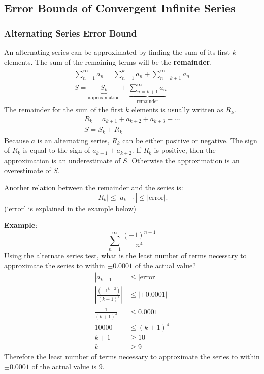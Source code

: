 \documentclass[12pt]{article}
\begin{document}
        \subsection{Error Bounds of Convergent Infinite Series}
            \subsubsection{Alternating Series Error Bound}
                An alternating series can be approximated by finding the sum of its first $k$ elements. The sum of the remaining terms will be the \textbf{remainder}.
                \begin{gather*}
                    \sum_{n=1}^\infty a_n = \sum_{n=1}^k a_n + \sum_{n=k+1}^\infty a_n \\[10pt]
                    S = \underbrace{S_k}_{\text{approximation}} + \underbrace{\sum_{n=k+1}^\infty a_n}_{\text{remainder}}
                \end{gather*}
                The remainder for the sum of the first $k$ elements is usually written as $R_k$.
                \begin{gather*}
                    R_k = a_{k+1} + a_{k+2} + a_{k+3} + \cdots \\
                    S = S_k + R_k
                \end{gather*}
                Because $a$ is an alternating series, $R_k$ can be either positive or negative. The sign of $R_k$ is equal to the sign of $a_{k+1} + a_{k+2}$. If $R_k$ is positive, then the approximation is an \underline{underestimate} of $S$. Otherwise the approximation is an \underline{overestimate} of $S$.

                \noindent Another relation between the remainder and the series is:
                \[ |R_k| \le |a_{k+1}| \le |\text{error}|. \]
                (`error' is explained in the example below)

                \noindent \textbf{Example}:
                \[ \sum_{n=1}^\infty \frac{(-1)^{n+1}}{n^4} \]
                Using the alternate series test, what is the least number of terms necessary to approximate the series to within $\pm 0.0001$ of the actual value?
                \begin{align*}
                    |a_{k+1}| &\le |\text{error}| \\[6pt]
                    \left| \frac{(-1^{k+2})}{(k+1)^4} \right| &\le |\pm 0.0001| \\[6pt]
                    \frac{1}{(k+1)^4} &\le 0.0001 \\[6pt]
                    10000 &\le (k+1)^4 \\
                    k+1 &\ge 10 \\
                    k &\ge 9
                \end{align*}
                Therefore the least number of terms necessary to approximate the series to within $\pm 0.0001$ of the actual value is $9$.
\end{document}
